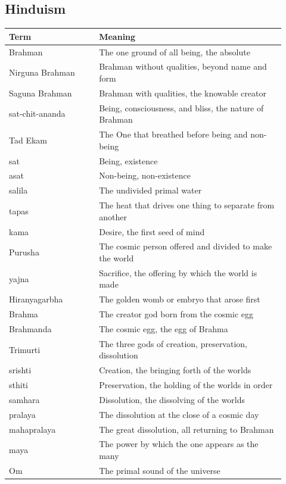
\subsection{Hinduism}

\begin{longtable}{L{0.30\linewidth} L{0.62\linewidth}}
\toprule
\textbf{Term} & \textbf{Meaning} \\
\midrule
\endhead
Brahman & The one ground of all being, the absolute \\
Nirguna Brahman & Brahman without qualities, beyond name and form \\
Saguna Brahman & Brahman with qualities, the knowable creator \\
sat-chit-ananda & Being, consciousness, and bliss, the nature of Brahman \\
Tad Ekam & The One that breathed before being and non-being \\
sat & Being, existence \\
asat & Non-being, non-existence \\
salila & The undivided primal water \\
tapas & The heat that drives one thing to separate from another \\
kama & Desire, the first seed of mind \\
Purusha & The cosmic person offered and divided to make the world \\
yajna & Sacrifice, the offering by which the world is made \\
Hiranyagarbha & The golden womb or embryo that arose first \\
Brahma & The creator god born from the cosmic egg \\
Brahmanda & The cosmic egg, the egg of Brahma \\
Trimurti & The three gods of creation, preservation, dissolution \\
srishti & Creation, the bringing forth of the worlds \\
sthiti & Preservation, the holding of the worlds in order \\
samhara & Dissolution, the dissolving of the worlds \\
pralaya & The dissolution at the close of a cosmic day \\
mahapralaya & The great dissolution, all returning to Brahman \\
maya & The power by which the one appears as the many \\
Om & The primal sound of the universe \\
\bottomrule
\end{longtable}

